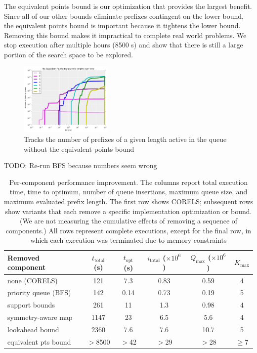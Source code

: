 The equivalent points bound is our optimization that provides the largest benefit.
Since all of our other bounds eliminate prefixes contingent on the lower bound, the equivalent points bound is important because it tightens the lower bound.
Removing this bound makes it impractical to complete real world problems.
We stop execution after multiple hours (8500 s) and show that there is still a large portion of the search space to be explored.

\begin{figure}[t!]
\begin{center}
\includegraphics[width=0.4\textwidth]{figs/equivalent_prefixes.png}
\end{center}
\caption{Tracks the number of prefixes of a given length active in the queue without the equivalent points bound}
\label{fig:equivalent-prefixes}
\end{figure}

TODO: Re-run BFS because numbers seem wrong

\begin{table}[t!]
\begin{tabular}{l | c | c | c | c | c}
Removed component & $t_\text{total}$ (s) & $t_\text{opt}$ (s) & $i_\text{total}$ ($\times 10^6$) & $Q_\text{max}$ ($\times 10^6$) & $K_\text{max}$ \\
\hline
none (CORELS) & 121 & 7.3 & 0.83 & 0.59 & 4 \\
priority queue (BFS) & 142 & 0.14 & 0.73 & 0.19 & 5 \\
support bounds & 261 & 11 & 1.3 & 0.98 & 4 \\
symmetry-aware map & 1147 & 23 & 6.5 & 5.6 & 4 \\
lookahead bound & 2360 & 7.6 & 7.6 & 10.7 & 5 \\
equivalent pts bound & $>$8500 & $>$42 & $>$29 & $>$28 & $\ge$7
\end{tabular}
\vspace{4mm}
\caption{Per-component performance improvement.
%
The columns report total execution time,
time to optimum, number of queue insertions,
maximum queue size, and maximum evaluated prefix length.
%
The first row shows CORELS; subsequent rows show variants
that each remove a specific implementation optimization or bound.
%
(We are not measuring the cumulative effects of removing a sequence of components.)
%
All rows represent complete executions, except for the final row,
in which each execution was terminated due to memory constraints
}
\label{tab:ablation}
\end{table}

